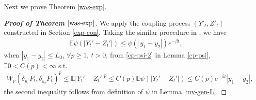 \documentclass[11pt,reqno]{amsart}
\numberwithin{equation}{section}
\begin{document}
Next we prove Theorem \ref{was-exp}.
\begin{proof}[\textbf{Proof of Theorem $\ref{was-exp}$}]
We apply the coupling process $(Y'_t,Z'_t)$ constructed
in Section \ref{exp-con}. Taking the similar procedure in \cite[p.1012, Proof of Theorem 1.2]{JW2}, we have
\begin{align*}
	\mathbb{E}\psi(|Y_t'-Z_t'|)\leq\psi(|y_1-y_2|)e^{-\beta t},
\end{align*}
when $|y_1-y_2|\leq L_0$, $\forall p\ge1$, $t>0$, from \eqref{cp-psi-2} in Lemma \ref{cp-psi}, $\exists 0<C(p)<\infty$ s.t. 
\begin{align}\label{e-p}
W_p(\delta_{y_1}P_t,\delta_{y_2}P_t)^p\leq\mathbb{E}|Y_t'-Z_t'|^p\le C(p)\mathbb{E}\psi(|Y_t'-Z_t'|) \leq C(p)e^{-\beta t}|y_1-y_2|, 
\end{align}
the second inequality follows from definition of $\psi$ in Lemma \ref{inv-gen-L}.




\end{proof}
\end{document}
